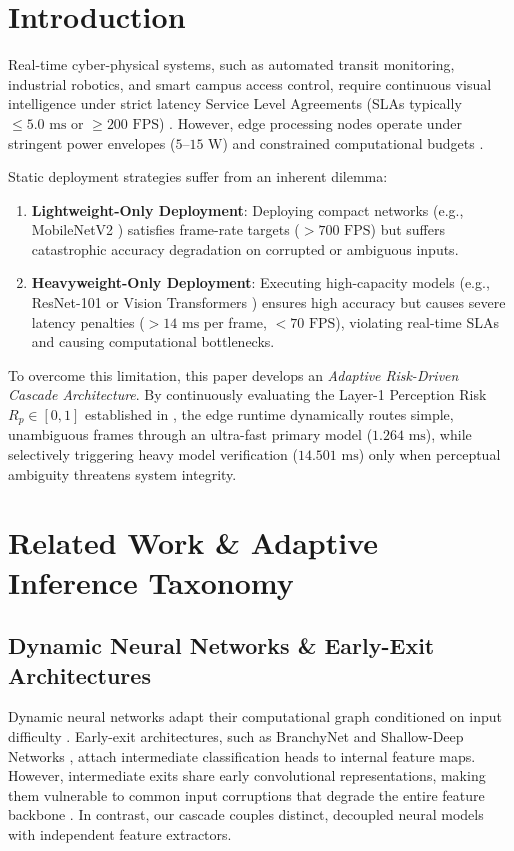 \documentclass[conference]{IEEEtran}
\begin{document}
\section{Introduction}
Real-time cyber-physical systems, such as automated transit monitoring, industrial robotics, and smart campus access control, require continuous visual intelligence under strict latency Service Level Agreements (SLAs typically $\le 5.0\text{ ms}$ or $\ge 200\text{ FPS}$) \cite{satyanarayanan2017emergence, chen2019deep}. However, edge processing nodes operate under stringent power envelopes ($5\text{--}15\text{ W}$) and constrained computational budgets \cite{canziani2016analysis}. 

Static deployment strategies suffer from an inherent dilemma:
\begin{enumerate}
    \item \textbf{Lightweight-Only Deployment}: Deploying compact networks (e.g., MobileNetV2 \cite{sandler2018mobilenetv2}) satisfies frame-rate targets ($>700\text{ FPS}$) but suffers catastrophic accuracy degradation on corrupted or ambiguous inputs.
    \item \textbf{Heavyweight-Only Deployment}: Executing high-capacity models (e.g., ResNet-101 \cite{he2016deep} or Vision Transformers \cite{vaswani2017attention}) ensures high accuracy but causes severe latency penalties ($>14\text{ ms}$ per frame, $<70\text{ FPS}$), violating real-time SLAs and causing computational bottlenecks.
\end{enumerate}

To overcome this limitation, this paper develops an \textit{Adaptive Risk-Driven Cascade Architecture}. By continuously evaluating the Layer-1 Perception Risk $R_p \in [0, 1]$ established in \cite{kumar2026scholar22}, the edge runtime dynamically routes simple, unambiguous frames through an ultra-fast primary model ($1.264\text{ ms}$), while selectively triggering heavy model verification ($14.501\text{ ms}$) only when perceptual ambiguity threatens system integrity.

\section{Related Work \& Adaptive Inference Taxonomy}
\subsection{Dynamic Neural Networks \& Early-Exit Architectures}
Dynamic neural networks adapt their computational graph conditioned on input difficulty \cite{han2021dynamic}. Early-exit architectures, such as BranchyNet \cite{teerapittayanon2016branchynet} and Shallow-Deep Networks \cite{kaya2019shallow}, attach intermediate classification heads to internal feature maps. However, intermediate exits share early convolutional representations, making them vulnerable to common input corruptions that degrade the entire feature backbone \cite{hendrycks2019benchmarking}. In contrast, our cascade couples distinct, decoupled neural models with independent feature extractors.
\end{document}
